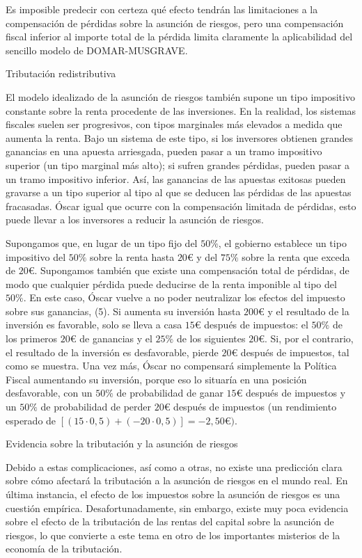 \documentclass[10pt,a4paper]{article}
\begin{document}
Es imposible predecir con certeza qué efecto tendrán las limitaciones a la compensación de pérdidas sobre la asunción de riesgos, pero una compensación fiscal inferior al importe total de la pérdida limita claramente la aplicabilidad del sencillo modelo de DOMAR-MUSGRAVE.

Tributación redistributiva

El modelo idealizado de la asunción de riesgos también supone un tipo impositivo constante sobre la renta procedente de las inversiones. En la realidad, los sistemas fiscales suelen ser progresivos, con tipos marginales más elevados a medida que aumenta la renta. Bajo un sistema de este tipo, si los inversores obtienen grandes ganancias en una apuesta arriesgada, pueden pasar a un tramo impositivo superior (un tipo marginal más alto); si sufren grandes pérdidas, pueden pasar a un tramo impositivo inferior. Así, las ganancias de las apuestas exitosas pueden gravarse a un tipo superior al tipo al que se deducen las pérdidas de las apuestas fracasadas. Óscar igual que ocurre con la compensación limitada de pérdidas, esto puede llevar a los inversores a reducir la asunción de riesgos.

Supongamos que, en lugar de un tipo fijo del $50\%$, el gobierno establece un tipo impositivo del $50\%$ sobre la renta hasta $20€$ y del $75\%$ sobre la renta que exceda de $20€$. Supongamos también que existe una compensación total de pérdidas, de modo que cualquier pérdida puede deducirse de la renta imponible al tipo del $50\%$. En este caso, Óscar vuelve a no poder neutralizar los efectos del impuesto sobre sus ganancias, (5). Si aumenta su inversión hasta $200€$ y el resultado de la inversión es favorable, solo se lleva a casa $15€$ después de impuestos: el $50\%$ de los primeros $20€$ de ganancias y el $25\%$ de los siguientes $20€$. Si, por el contrario, el resultado de la inversión es desfavorable, pierde $20€$ después de impuestos, tal como se muestra. Una vez más, Óscar no compensará simplemente la Política Fiscal aumentando su inversión, porque eso lo situaría en una posición desfavorable, con un $50\%$ de probabilidad de ganar $15€$ después de impuestos y un $50\%$ de probabilidad de perder $20€$ después de impuestos (un rendimiento esperado de $[(15\cdot 0,5) + (−20 \cdot 0,5)] = −2,50€)$.



Evidencia sobre la tributación y la asunción de riesgos

Debido a estas complicaciones, así como a otras, no existe una predicción clara sobre cómo afectará la tributación a la asunción de riesgos en el mundo real. En última instancia, el efecto de los impuestos sobre la asunción de riesgos es una cuestión empírica. Desafortunadamente, sin embargo, existe muy poca evidencia sobre el efecto de la tributación de las rentas del capital sobre la asunción de riesgos, lo que convierte a este tema en otro de los importantes misterios de la economía de la tributación.
\end{document}
